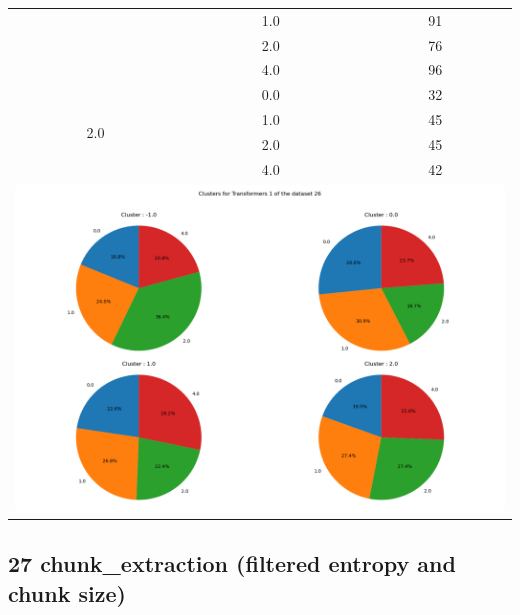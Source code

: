 \begin{longtable}{|c|c|c|c|c|}
& \multicolumn{2}{c|}{1.0} & \multicolumn{2}{c|}{91} \\
& \multicolumn{2}{c|}{2.0} & \multicolumn{2}{c|}{76} \\
& \multicolumn{2}{c|}{4.0} & \multicolumn{2}{c|}{96} \\
\hline
\multirow{4}{*}{2.0} & \multicolumn{2}{c|}{0.0} & \multicolumn{2}{c|}{32} \\
& \multicolumn{2}{c|}{1.0} & \multicolumn{2}{c|}{45} \\
& \multicolumn{2}{c|}{2.0} & \multicolumn{2}{c|}{45} \\
& \multicolumn{2}{c|}{4.0} & \multicolumn{2}{c|}{42} \\
\hline
\multicolumn{5}{|c|}{\includegraphics[width=0.8\linewidth]{img/annexes/26/clustering_pie_charts/Transformers 1.png}} \\
\end{longtable}


\subsection{27 chunk\_extraction (filtered entropy and chunk size)}

